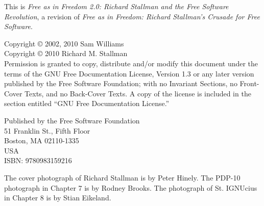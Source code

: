 \noindent This is \textit{Free as in Freedom 2.0: Richard Stallman and
  the Free Software Revolution}, a revision of \textit{Free as in
  Freedom: Richard Stallman's Crusade for Free Software}.

\bigskip

\noindent Copyright \copyright{} 2002, 2010 Sam Williams\\
Copyright \copyright{} 2010 Richard M. Stallman\\
Permission is granted to copy, distribute and/or modify
this document under the terms of the GNU Free Documentation License,
Version 1.3 or any later version published by the Free Software
Foundation; with no Invariant Sections, no Front-Cover Texts, and no
Back-Cover Texts. A copy of the license is included in the section
entitled ``GNU Free Documentation License.''

\bigskip

\noindent Published by the Free Software Foundation\\
51 Franklin St., Fifth Floor\\
Boston, MA 02110-1335\\
USA\\
ISBN: 9780983159216\\

\bigskip

\noindent The cover photograph of Richard Stallman is by Peter Hinely. The PDP-10 photograph in Chapter 7 is by Rodney Brooks. The photograph of St. IGNUcius in Chapter 8 is by Stian Eikeland. 
